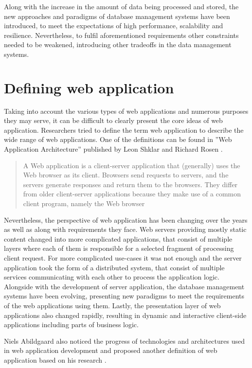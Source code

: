 Along with the increase in the amount of data being processed and stored, the new approaches and paradigms of database management systems have been introduced, to meet the expectations of high performance, scalability and resilience. Nevertheless, to fulfil aforementioned requirements other constraints needed to be weakened, introducing other tradeoffs in the data management systems.

\section{Defining web application}

Taking into account the various types of web applications and numerous purposes they may serve, it can be difficult to clearly present the core ideas of web application. Researchers tried to define the term web application to describe the wide range of web applications. One of the definitions can be found in ''Web Application Architecture'' published by Leon Shklar and Richard Rosen \cite{WebAppArchitecture}.

\begin{quotation}
A Web application is a client-server application that (generally) uses the Web browser as its client. Browsers send requests to servers, and the servers generate responses and return them to the browsers. They differ from older client-server applications because they make use of a common client program, namely the Web browser
\end{quotation}

Nevertheless, the perspective of web application has been changing over the years as well as along with requirements they face. Web servers providing mostly static content changed into more complicated applications, that consist of multiple layers where each of them is responsible for a selected fragment of processing client request. For more complicated use-cases it was not enough and the server application took the form of a distributed system, that consist of multiple services communicating with each other to process the application logic. Alongside with the development of server application, the database management systems have been evolving, presenting new paradigms to meet the requirements of the web applications using them. Lastly, the presentation layer of web applications also changed rapidly, resulting in dynamic and interactive client-side applications including parts of business logic.

Niels Abildgaard also noticed the progress of technologies and architectures used in web application development and proposed another definition of web application based on his research \cite{PerspectivesOnArchitectureEvolution}.

